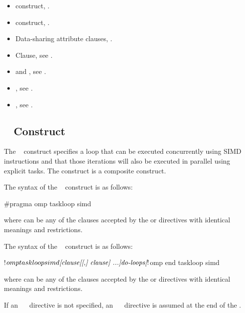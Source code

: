 \crossreferences
\begin{itemize}
\item {} construct, .
\item {} construct, .
\item Data-sharing attribute clauses, .
\item {} Clause, see .
\item {} and , see
  .
\item {}, see .
\item {}, see
.

\end{itemize}






%
%
\subsection{~ Construct}
\label{subsec:taskloop simd Construct}
\summary
The ~ construct specifies a loop that can be
executed concurrently using SIMD instructions and that those iterations
will also be executed in parallel using explicit tasks. The 
 construct is a composite construct.

\syntax
\begin{ccppspecific}
The syntax of the ~ construct is as follows:
\begin{ompcPragma}
#pragma omp taskloop simd 
\end{ompcPragma}
where  can be any of the clauses accepted by the  or  directives with identical meanings and restrictions.
\end{ccppspecific}
\begin{fortranspecific}
The syntax of the ~ construct is as follows:
\begin{ompfPragma}
!$omp taskloop simd \plc{[clause[[,] clause] ...]}
    \plc{do-loops}
\plc{[}!$omp end taskloop simd\plc{]}
\end{ompfPragma}
where  can be any of the clauses accepted by the  or  directives with identical meanings and restrictions.

If an ~~ directive is not specified, an ~~ directive is assumed at the end of the .
\end{fortranspecific}

